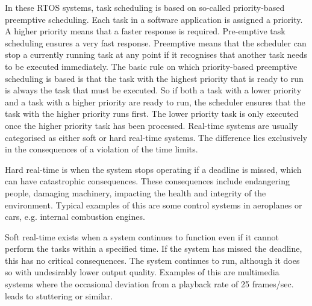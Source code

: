 \documentclass[MMR,Master,english]{twbook}
\begin{document}
\bigskip \noindent In these RTOS systems, task scheduling is based on so-called priority-based preemptive scheduling. Each task in a software application is assigned a priority. A higher priority means that a faster response is required. Pre-emptive task scheduling ensures a very fast response. Preemptive means that the scheduler can stop a currently running task at any point if it recognises that another task needs to be executed immediately. The basic rule on which priority-based preemptive scheduling is based is that the task with the highest priority that is ready to run is always the task that must be executed. So if both a task with a lower priority and a task with a higher priority are ready to run, the scheduler ensures that the task with the higher priority runs first. The lower priority task is only executed once the higher priority task has been processed. Real-time systems are usually categorised as either soft or hard real-time systems. The difference lies exclusively in the consequences of a violation of the time limits. 

\bigskip \noindent Hard real-time is when the system stops operating if a deadline is missed, which can have catastrophic consequences. These consequences include endangering people, damaging machinery, impacting the health and integrity of the environment. Typical examples of this are some control systems in aeroplanes or cars, e.g. internal combustion engines.

\bigskip \noindent Soft real-time exists when a system continues to function even if it cannot perform the tasks within a specified time. If the system has missed the deadline, this has no critical consequences. The system continues to run, although it does so with undesirably lower output quality. Examples of this are multimedia systems where the occasional deviation from a playback rate of 25 frames/sec. leads to stuttering or similar.
\end{document}
